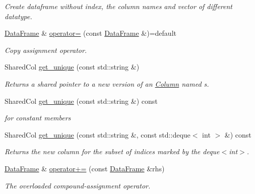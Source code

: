 \begin{DoxyCompactItemize}
\begin{DoxyCompactList}\small\item\em Create dataframe without index, the column names and vector of different datatype. \end{DoxyCompactList}\item 
\hyperlink{classDataFrame}{Data\+Frame} \& \hyperlink{classDataFrame_a26164d4d8119ea34da73eb0c48bd3972}{operator=} (const \hyperlink{classDataFrame}{Data\+Frame} \&)=default
\begin{DoxyCompactList}\small\item\em Copy assignment operator. \end{DoxyCompactList}\item 
Shared\+Col \hyperlink{classDataFrame_a5909652f24e66c22922b4b4c910f2b09}{get\+\_\+unique} (const std\+::string \&)
\begin{DoxyCompactList}\small\item\em Returns a shared pointer to a new version of an \hyperlink{classColumn}{Column} named s. \end{DoxyCompactList}\item 
\mbox{\label{classDataFrame_afa835fbc006732850a6483ba8635db2e}} 
Shared\+Col \hyperlink{classDataFrame_afa835fbc006732850a6483ba8635db2e}{get\+\_\+unique} (const std\+::string \&) const
\begin{DoxyCompactList}\small\item\em for constant members \end{DoxyCompactList}\item 
\mbox{\label{classDataFrame_a4dac2312a688462087cd8c9cbef1c6bb}} 
Shared\+Col \hyperlink{classDataFrame_a4dac2312a688462087cd8c9cbef1c6bb}{get\+\_\+unique} (const std\+::string \&, const std\+::deque$<$ int $>$ \&) const
\begin{DoxyCompactList}\small\item\em Returns the new column for the subset of indices marked by the deque$<$int$>$. \end{DoxyCompactList}\item 
\hyperlink{classDataFrame}{Data\+Frame} \& \hyperlink{classDataFrame_a61f3301cc72548b4b3536c0844fb156d}{operator+=} (const \hyperlink{classDataFrame}{Data\+Frame} \&rhs)
\begin{DoxyCompactList}\small\item\em The overloaded compound-\/assignment operator. \end{DoxyCompactList}\item 

\end{DoxyCompactItemize}
